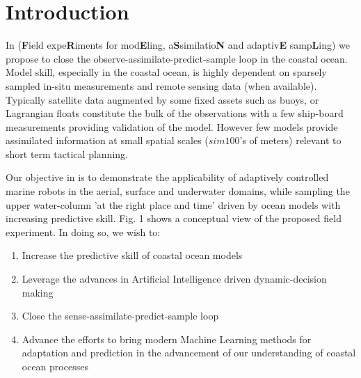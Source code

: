 \section{Introduction}





In \proj (\textbf{F}ield expe\textbf{R}iments for mod\textbf{E}ling,
a\textbf{S}similatio\textbf{N} and adaptiv\textbf{E}
samp\textbf{L}ing) we propose to close the
observe-assimilate-predict-sample loop in the coastal ocean. Model
skill, especially in the coastal ocean, is highly dependent on
sparsely sampled in-situ measurements and remote sensing data (when
available). Typically satellite data augmented by some fixed assets
such as buoys, or Lagrangian floats constitute the bulk of the
observations with a few ship-board measurements providing validation
of the model. However few models provide assimilated information at
small spatial scales ($sim 100$'s of meters) relevant to short term
tactical planning.

Our objective in \proj is to demonstrate the applicability of adaptively
controlled marine robots in the aerial, surface and underwater domains,
while sampling the upper water-column 'at the right place and time'
driven by ocean models with increasing predictive skill. Fig. 1 shows a
conceptual view of the proposed field experiment. In doing so, we wish
to:

\begin{enumerate}

\item Increase the predictive skill of coastal ocean models

\item Leverage the advances in Artificial Intelligence driven
  dynamic-decision making

\item Close the sense-assimilate-predict-sample loop
  
\item Advance the efforts to bring modern Machine Learning methods for
  adaptation and prediction in the advancement of our understanding of
  coastal ocean processes
  
\end{enumerate}


